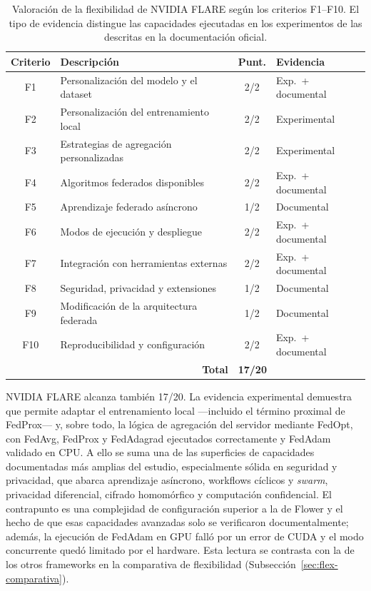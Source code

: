 \begin{table}[htbp]
  \centering
  \caption{Valoración de la flexibilidad de NVIDIA FLARE según los criterios
  F1--F10. El tipo de evidencia distingue las capacidades ejecutadas en los
  experimentos de las descritas en la documentación oficial.}
  \label{tab:flex-nvflare-score}
  \begin{tabular}{clcl}
    \toprule
    \textbf{Criterio} & \textbf{Descripción} & \textbf{Punt.} & \textbf{Evidencia} \\
    \midrule
    F1  & Personalización del modelo y el dataset      & 2/2 & Exp.\ + documental \\
    F2  & Personalización del entrenamiento local      & 2/2 & Experimental \\
    F3  & Estrategias de agregación personalizadas     & 2/2 & Experimental \\
    F4  & Algoritmos federados disponibles             & 2/2 & Exp.\ + documental \\
    F5  & Aprendizaje federado asíncrono               & 1/2 & Documental \\
    F6  & Modos de ejecución y despliegue              & 2/2 & Exp.\ + documental \\
    F7  & Integración con herramientas externas        & 2/2 & Exp.\ + documental \\
    F8  & Seguridad, privacidad y extensiones          & 1/2 & Documental \\
    F9  & Modificación de la arquitectura federada     & 1/2 & Documental \\
    F10 & Reproducibilidad y configuración             & 2/2 & Exp.\ + documental \\
    \midrule
    \multicolumn{2}{r}{\textbf{Total}} & \multicolumn{2}{l}{\textbf{17/20}} \\
    \bottomrule
  \end{tabular}
\end{table}

NVIDIA FLARE alcanza también 17/20. La evidencia experimental
demuestra que permite adaptar el entrenamiento local —incluido el término proximal
de FedProx— y, sobre todo, la lógica de agregación del servidor mediante FedOpt, con
FedAvg, FedProx y FedAdagrad ejecutados correctamente y FedAdam validado en CPU. A
ello se suma una de las superficies de capacidades documentadas más amplias del
estudio, especialmente sólida en seguridad y privacidad, que abarca aprendizaje
asíncrono, workflows cíclicos y \textit{swarm}, privacidad
diferencial, cifrado homomórfico y computación confidencial. El contrapunto es una
complejidad de configuración superior a la de Flower y el hecho de que esas
capacidades avanzadas solo se verificaron documentalmente; además, la ejecución de
FedAdam en GPU falló por un error de CUDA y el modo concurrente quedó limitado por el
hardware. Esta lectura se contrasta con la de los otros frameworks en la comparativa
de flexibilidad (Subsección~\ref{sec:flex-comparativa}).

